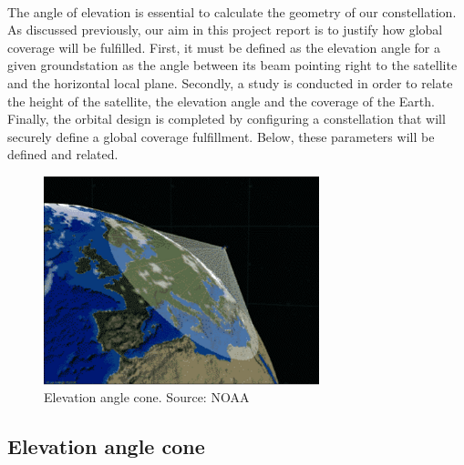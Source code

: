 \paragraph{ }

The angle of elevation is essential to calculate the geometry of our constellation. As discussed previously, our aim in this project report is to justify how global coverage will be fulfilled. First, it must be defined as the elevation angle for a given groundstation as the angle between its beam pointing right to the satellite and the horizontal local plane. Secondly, a study is conducted in order to relate the height of the satellite, the elevation angle and the coverage of the Earth. Finally, the orbital design is completed by configuring a constellation that will securely define a global coverage fulfillment. Below, these parameters will be defined and related. 

\begin{figure}[h]
\includegraphics[width=8cm]{noaa}
\centering
\caption{Elevation angle cone. Source: NOAA}
\end{figure}

\subsection{Elevation angle cone}

\paragraph{ }

